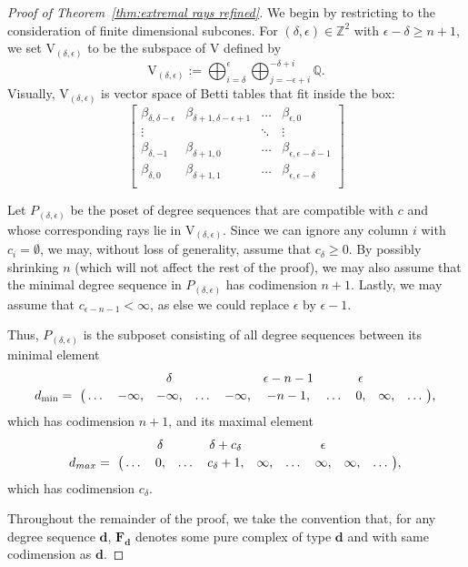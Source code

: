 \documentclass[12pt]{amsart}
\theoremstyle{definition}
\theoremstyle{remark}
\newcommand{\ZZ}{\mathbb{Z}}
\newcommand{\QQ}{\mathbb{Q}}
\newcommand{\VV}{\mathrm{V}}
\newcommand{\cc}{c}
\newcommand{\dd}{\mathbf{d}}
\newcommand{\FF}{\mathbf{F}}
\newcommand{\nothing}{\emptyset}
\begin{document}
\begin{proof}[Proof of Theorem~\ref{thm:extremal rays refined}]
We begin by restricting to the consideration of finite dimensional subcones.  For $(\delta,\epsilon)\in \ZZ^2$ with $\epsilon-\delta\geq n+1$, we set $\VV_{(\delta,\epsilon)}$ to be the subspace of $\VV$ defined by
\[
\VV_{(\delta,\epsilon)}:=\bigoplus_{i=\delta}^\epsilon \bigoplus_{j=-\epsilon +i}^{-\delta+i} \QQ.
\]
Visually, $\VV_{(\delta,\epsilon)}$ is vector space of Betti tables that fit inside the box:
\[
\begin{bmatrix}
\beta_{\delta,\delta-\epsilon}&\beta_{\delta+1,\delta-\epsilon+1}&\dots&\beta_{\epsilon,0}\\
\vdots & &\ddots & \vdots\\
\beta_{\delta,-1}&\beta_{\delta+1,0}&\dots&\beta_{\epsilon,\epsilon-\delta-1}\\
\beta_{\delta,0}&\beta_{\delta+1,1}&\dots&\beta_{\epsilon,\epsilon-\delta}\\
\end{bmatrix}
\]


Let $P_{(\delta,\epsilon)}$ be the poset of degree sequences that are compatible with $\cc$ and whose corresponding rays lie in $\VV_{(\delta,\epsilon)}$.
Since we can ignore any column $i$ with $c_i=\nothing$, we may, without loss of generality, assume that $c_\delta \geq 0$.  By possibly shrinking $n$ (which will not affect the rest of the proof), we may also assume that the minimal degree sequence in $P_{(\delta,\epsilon)}$ has codimension $n+1$.  Lastly, we may assume that $c_{\epsilon-n-1}<\infty$, as else we could replace $\epsilon$ by $\epsilon-1$.

Thus, $P_{(\delta,\epsilon)}$ is the subposet consisting of all degree sequences between its minimal element 
\[\bordermatrix{&&&\delta&&&\epsilon-n-1&&\epsilon &&\cr
              d_{\min}= &\dots&-\infty,&-\infty,&\dots&-\infty,&-n-1,&\dots &0, &\infty,&\dots\cr},
              \]
              which has codimension $n+1$, and its maximal element
\[\bordermatrix{&&\delta&&\delta+c_\delta&&&\epsilon &&\cr
              d_{max}= &\dots&0,&\dots&c_{\delta}+1,&\infty,&\dots &\infty,&\infty,&\dots\cr},\]
              which has codimension $c_{\delta}$.


Throughout the remainder of the proof, we take the convention that, for any degree sequence $\dd$, $\FF_{\dd}$ denotes some pure complex of type $\dd$ and with same codimension as $\dd$.




\end{proof}
\end{document}
